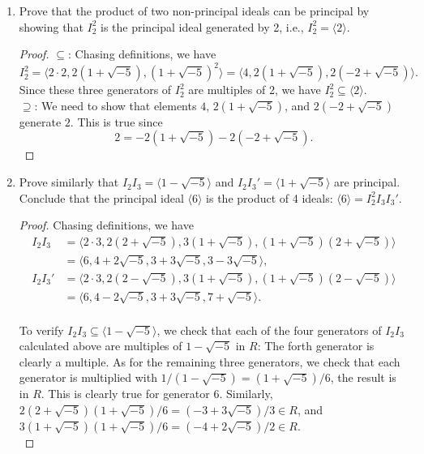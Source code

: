 \documentclass{article}
\begin{document}
\begin{enumerate}[label={\bf(\alph*)}]
\begin{proof}
        The argument for showing $I_3'$ is non-principal is analogous to
        the argument for $I_3$.
      \end{proof}

    \item Prove that the product of two non-principal ideals can be
      principal by showing that $I_2^2$ is the principal ideal generated by
      2, i.e., $I_2^2=\langle2\rangle$.
      \begin{proof}
        $\subseteq$: Chasing definitions, we have \[I_2^2=\langle 2\cdot2,
        2(1+\sqrt{-5}), (1+\sqrt{-5})^2 \rangle =\langle4,
        2(1+\sqrt{-5}), 2(-2+\sqrt{-5}) \rangle.\] Since
        these three generators of $I_2^2$ are multiples of 2, we have
        $I_2^2\subseteq\langle2\rangle$. \\

        $\supseteq$: We need to show that elements $4$, $2(1+\sqrt{-5})$,
        and $2(-2+\sqrt{-5})$ generate $2$. This is true since
        \[2=-2(1+\sqrt{-5})-2(-2+\sqrt{-5}).\]
      \end{proof}

    \item Prove similarly that $I_2I_3=\langle1-\sqrt{-5}\rangle$ and
      $I_2I_3'=\langle1+\sqrt{-5}\rangle$ are principal. Conclude that the
      principal ideal $\langle6\rangle$ is the product of 4 ideals:
      $\langle6\rangle=I_2^2I_3I_3'$.

      \begin{proof}
        Chasing definitions, we have
        \begin{align*}
          I_2I_3 &=\langle 2\cdot3, 2(2+\sqrt{-5}), 3(1+\sqrt{-5}),
            (1+\sqrt{-5})(2+\sqrt{-5}) \rangle
            \\
            &=\langle6, 4+2\sqrt{-5}, 3+3\sqrt{-5}, 3-3\sqrt{-5} \rangle, \\
          I_2I_3' &=\langle 2\cdot3, 2(2-\sqrt{-5}), 3(1+\sqrt{-5}),
            (1+\sqrt{-5})(2-\sqrt{-5}) \rangle
            \\
            &=\langle6, 4-2\sqrt{-5}, 3+3\sqrt{-5}, 7+\sqrt{-5} \rangle. \\
        \end{align*}

        To verify $I_2I_3\subseteq\langle1-\sqrt{-5}\rangle$, we check that
        each of the four generators of $I_2I_3$ calculated above are
        multiples of $1-\sqrt{-5}$ in $R$: The forth generator is clearly a
        multiple. As for the remaining three generators, we check that each
        generator is multiplied with $1/(1-\sqrt{-5})=(1+\sqrt{-5})/6$, the
        result is in $R$. This is clearly true for generator 6. Similarly,
        $2(2+\sqrt{-5})(1+\sqrt{-5})/6=(-3+3\sqrt{-5})/3\in R$, and
        $3(1+\sqrt{-5})(1+\sqrt{-5})/6=(-4+2\sqrt{-5})/2\in R$. \\


\end{proof}
\end{enumerate}
\end{document}
